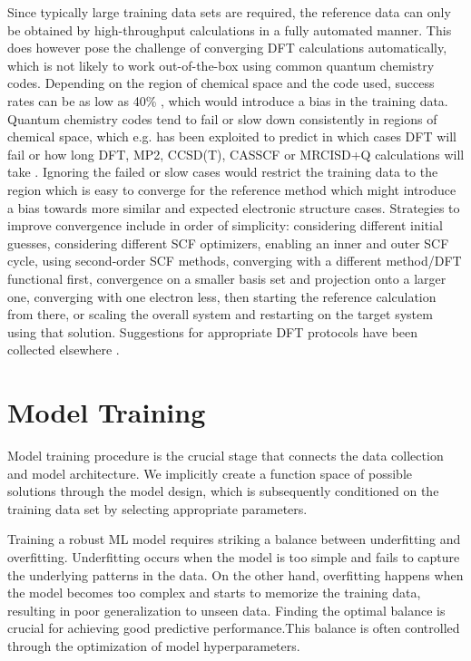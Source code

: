 \documentclass[9pt,bestpractices]{livecoms}
\begin{document}
Since typically large training data sets are required, the reference data can
only be obtained by high-throughput calculations in a fully automated manner.
This does however pose the challenge of converging DFT calculations
automatically, which is not likely to work out-of-the-box using common quantum
chemistry codes. Depending on the region of chemical space and the code used,
success rates can be as low as 40\% \cite{heinenTransitionStateSearch2022}, which
would introduce a bias in the training data. Quantum chemistry codes tend to
fail or slow down consistently in regions of chemical space, which e.g. has been
exploited to predict in which cases DFT will
fail \cite{duanLearningFailurePredicting2019} or how long DFT, MP2, CCSD(T),
CASSCF or MRCISD+Q calculations will
take \cite{heinenMachineLearningComputational2020}. Ignoring the failed or slow
cases would restrict the training data to the region which is easy to converge
for the reference method which might introduce a bias towards more similar and
expected electronic structure cases. Strategies to improve convergence include
in order of simplicity: considering different initial guesses, considering
different SCF optimizers, enabling an inner and outer SCF cycle, using
second-order SCF methods, converging with a different method/DFT functional
first, convergence on a smaller basis set and projection onto a larger one,
converging with one electron less, then starting the reference calculation from
there, or scaling the overall system and restarting on the target system using
that solution. Suggestions for appropriate DFT protocols have been collected
elsewhere \cite{burschBestPracticeDFT2022}.

\section{Model Training}

Model training procedure is the crucial stage that connects the data collection and model architecture. We implicitly create a function space of possible solutions through the model design, which is subsequently conditioned on the training data set by selecting appropriate parameters. \cite{keithCombiningMachineLearning2021}


Training a robust ML model requires striking a balance between underfitting and
overfitting. Underfitting occurs when the model is too simple and fails to
capture the underlying patterns in the data. On the other hand, overfitting
happens when the model becomes too complex and starts to memorize the training
data, resulting in poor generalization to unseen data. Finding the optimal
balance is crucial for achieving good predictive performance.This balance is
often controlled through the optimization of model hyperparameters.
\end{document}

